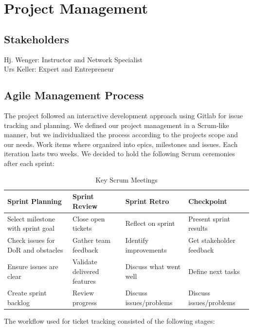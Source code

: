 
\chapter{Project Management}\label{ch:project-management}

\section{Stakeholders}\label{sec:stakeholer}
Hj. Wenger: Instructor and Network Specialist \\
Urs Keller: Expert and Entrepreneur

\section{Agile Management Process}\label{sec:agile-management-process}

The project followed an interactive development approach using Gitlab for issue tracking and planning.
We defined our project management in a Scrum-like manner, but we individualized the process according to the projects scope and our needs.
Work items where organized into epics, milestones and issues.
Each iteration lasts two weeks.
We decided to hold the following Scrum ceremonies after each sprint:

\begin{table}[H]
	\centering
	\begin{tabularx}{\textwidth}{YYYY}
		\toprule
		\textbf{Sprint Planning} & \textbf{Sprint Review} & \textbf{Sprint Retro} & \textbf{Checkpoint} \\
		\midrule
		Select milestone with sprint goal & Close open tickets & Reflect on sprint & Present sprint results \\
		\midrule
		Check issues for DoR and obstacles & Gather team feedback & Identify improvements & Get stakeholder feedback \\
		\midrule
		Ensure issues are clear & Validate delivered features & Discuss what went well & Define next tasks \\
		\midrule
		Create sprint backlog & Review progress & Discuss issues/problems & Discuss issues/problems \\
		\bottomrule
	\end{tabularx}
	\caption{Key Scrum Meetings}
	\label{tab:scrum-meetings}
\end{table}

The workflow used for ticket tracking consisted of the following stages:

